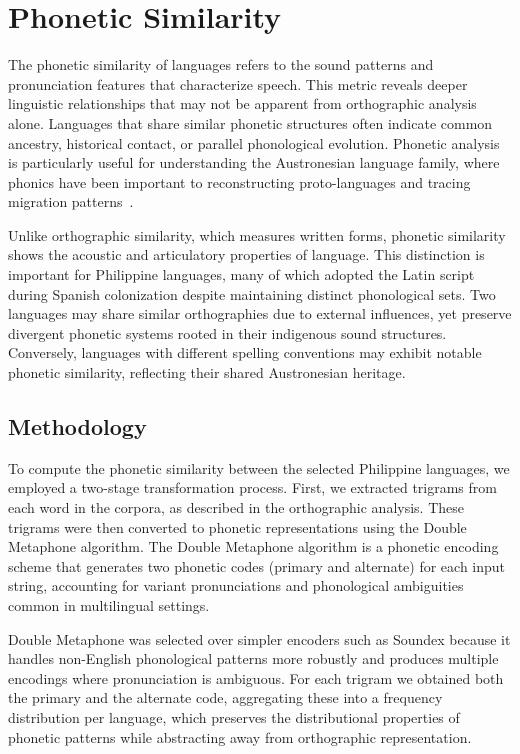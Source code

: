 \section{Phonetic Similarity}

The phonetic similarity of languages refers to the sound patterns and pronunciation features that characterize speech. This metric reveals deeper linguistic relationships that may not be apparent from orthographic analysis alone. Languages that share similar phonetic structures often indicate common ancestry, historical contact, or parallel phonological evolution. Phonetic analysis is particularly useful for understanding the Austronesian language family, where phonics have been important to reconstructing proto-languages and tracing migration patterns~\cite{Blust_1991}.

Unlike orthographic similarity, which measures written forms, phonetic similarity shows the acoustic and articulatory properties of language. This distinction is important for Philippine languages, many of which adopted the Latin script during Spanish colonization despite maintaining distinct phonological sets. Two languages may share similar orthographies due to external influences, yet preserve divergent phonetic systems rooted in their indigenous sound structures. Conversely, languages with different spelling conventions may exhibit notable phonetic similarity, reflecting their shared Austronesian heritage.

\subsection{Methodology}

To compute the phonetic similarity between the selected Philippine languages, we employed a two-stage transformation process. First, we extracted trigrams from each word in the corpora, as described in the orthographic analysis. These trigrams were then converted to phonetic representations using the Double Metaphone algorithm. The Double Metaphone algorithm is a phonetic encoding scheme that generates two phonetic codes (primary and alternate) for each input string, accounting for variant pronunciations and phonological ambiguities common in multilingual settings.

Double Metaphone was selected over simpler encoders such as Soundex because it
handles non-English phonological patterns more robustly and produces multiple
encodings where pronunciation is ambiguous. For each trigram we obtained both the
primary and the alternate code, aggregating these into a frequency distribution
per language, which preserves the distributional properties of phonetic patterns
while abstracting away from orthographic representation.

